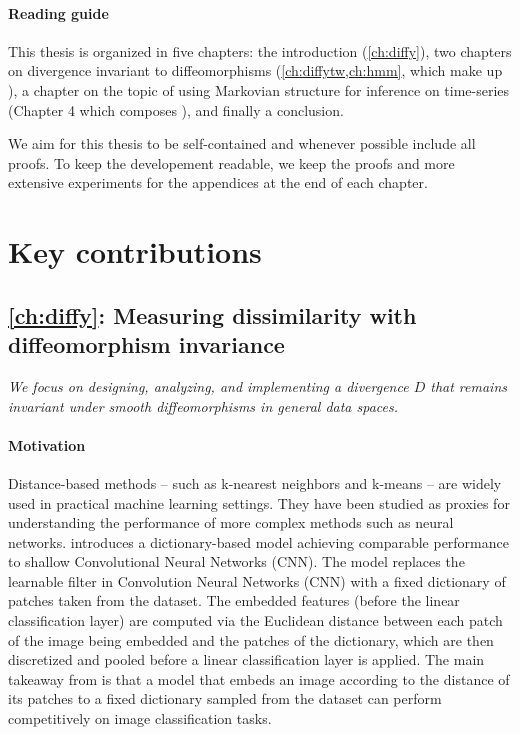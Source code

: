 \paragraph{Reading guide}

This thesis is organized in five chapters: the introduction (\cref{ch:diffy}), two chapters on divergence invariant to diffeomorphisms (\cref{ch:diffytw,ch:hmm}, which make up ), a chapter on the topic of using Markovian structure for inference on time-series (Chapter 4 which composes ), and finally a conclusion.

We aim for this thesis to be self-contained and whenever possible include all proofs. To keep the developement readable, we keep the proofs and more extensive experiments for the appendices at the end of each chapter.

\section{Key contributions}



\subsection*{\cref{ch:diffy}: Measuring dissimilarity with diffeomorphism invariance}

\emph{We focus on designing, analyzing, and implementing a divergence $D$ that remains invariant under smooth diffeomorphisms in general data spaces.}


\paragraph{Motivation}
Distance-based methods -- such as k-nearest neighbors and k-means -- are widely used in practical machine learning settings. They have been studied as proxies for understanding the performance of more complex methods such as neural networks. \cite{thiry} introduces a dictionary-based model achieving comparable performance to shallow Convolutional Neural Networks (CNN). The model replaces the learnable filter in Convolution Neural Networks (CNN) with a fixed dictionary of patches taken from the dataset. The embedded features (before the linear classification layer) are computed via the Euclidean distance between each patch of the image being embedded and the patches of the dictionary, which are then discretized and pooled before a linear classification layer is applied. The main takeaway from \cite{thiry} is that a model that embeds an image according to the distance of its patches to a fixed dictionary sampled from the dataset can perform competitively on image classification tasks.

